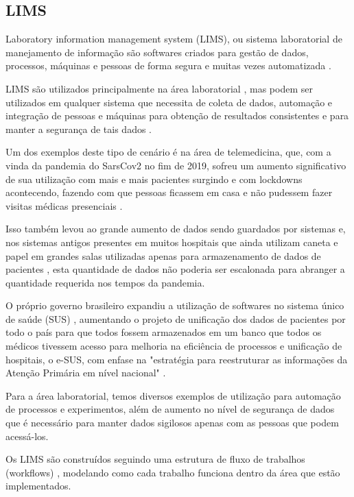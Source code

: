 \subsection{LIMS}


Laboratory information management system (LIMS), ou sistema laboratorial de manejamento de informação são softwares criados para gestão de dados, processos, máquinas e pessoas de forma segura e muitas vezes automatizada \cite{Stafford1998LIMS:Technology}.


LIMS são utilizados principalmente na área laboratorial \R, mas podem ser utilizados em qualquer sistema que necessita de coleta de dados, automação e integração de pessoas e máquinas para obtenção de resultados consistentes e para manter a segurança de tais dados \R.

Um dos exemplos deste tipo de cenário é na área de telemedicina, que, com a vinda da pandemia do SarsCov2 no fim de 2019, sofreu um aumento significativo de sua utilização com mais e mais pacientes surgindo e com lockdowns acontecendo, fazendo com que pessoas ficassem em casa e não pudessem fazer visitas médicas presenciais \R.

Isso também levou ao grande aumento de dados sendo guardados por sistemas e, nos sistemas antigos presentes em muitos hospitais que ainda utilizam caneta e papel em grandes salas utilizadas apenas para armazenamento de dados de pacientes \R, esta quantidade de dados não poderia ser escalonada para abranger a quantidade requerida nos tempos da pandemia.


O próprio governo brasileiro expandiu a utilização de softwares no sistema único de saúde (SUS) \R, aumentando o projeto de unificação dos dados de pacientes por todo o país para que todos fossem armazenados em um banco que todos os médicos tivessem acesso para melhoria na eficiência de processos e unificação de hospitais, o  e-SUS, com enfase na "estratégia para reestruturar as informações da Atenção Primária em nível nacional" \R.

Para a área laboratorial, temos diversos exemplos de utilização para automação de processos e experimentos, além de aumento no nível de segurança de dados que é necessário para manter dados sigilosos apenas com as pessoas que podem acessá-los. \NO

Os LIMS são construídos seguindo uma estrutura de fluxo de trabalhos (workflows) \R, modelando como cada trabalho funciona dentro da área que estão implementados. \NO

